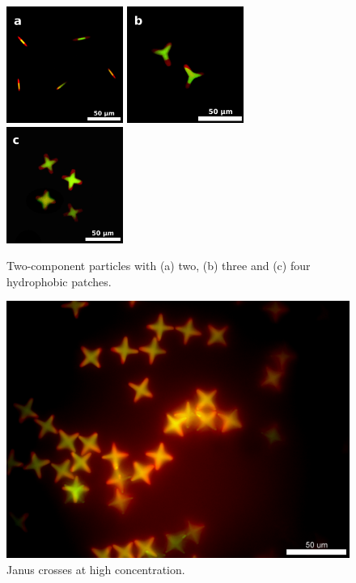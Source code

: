 \begin{figure}[h]
\begin{center}
\includegraphics[height=1.5in]{figures/complex-shapes/two-patch-rods-single-image.png} \includegraphics[height=1.5in]{figures/complex-shapes/janus-threepatch-single-image.png} \includegraphics[height=1.5in]{figures/complex-shapes/janus-crosses-single-image.png}
\end{center}
\caption{Two-component particles with (a) two, (b) three and (c) four hydrophobic patches.}
\label{fig:branched-series}
\end{figure}

\begin{figure}[h]
\begin{center}
\includegraphics[width=0.6\linewidth]{figures/complex-shapes/crosses-high-conc.png}
\end{center}
\caption{Janus crosses at high concentration.}
\label{fig:crosses-high-conc}
\end{figure}

